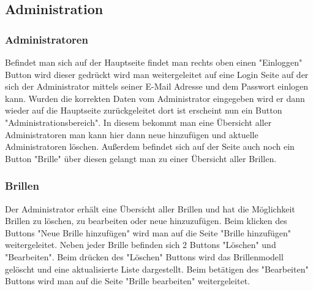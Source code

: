 \subsection{Administration}

\subsubsection{Administratoren}
Befindet man sich auf der Hauptseite findet man rechts oben einen "Einloggen" Button wird dieser gedrückt wird man weitergeleitet auf eine Login Seite auf der sich der Administrator mittels seiner E-Mail Adresse und dem Passwort einlogen kann. Wurden die korrekten Daten vom Administrator eingegeben wird er dann wieder auf die Hauptseite zurückgeleitet dort ist erscheint nun ein Button "Administrationsbereich". In diesem bekommt man eine Übersicht aller Administratoren man kann hier dann neue hinzufügen und aktuelle Administratoren löschen. Außerdem befindet sich auf der Seite auch noch ein Button "Brille" über diesen gelangt man zu einer Übersicht aller Brillen.

\subsubsection{Brillen}
Der Administrator erhält eine Übersicht aller Brillen und hat die Möglichkeit Brillen zu löschen, zu bearbeiten oder neue hinzuzufügen. Beim klicken des Buttons "Neue Brille hinzufügen" wird man auf die Seite "Brille hinzufügen" weitergeleitet. Neben jeder Brille befinden sich 2 Buttons "Löschen" und "Bearbeiten". Beim drücken des "Löschen" Buttons wird das Brillenmodell gelöscht und eine aktualisierte Liste dargestellt. Beim betätigen des "Bearbeiten" Buttons wird man auf die Seite "Brille bearbeiten" weitergeleitet.

